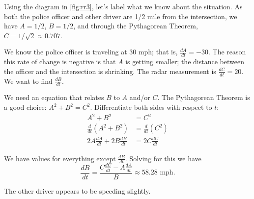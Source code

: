 {Using the diagram in \autoref{fig:rr3}, let's label what we know about the situation. As both the police officer and other driver are 1/2 mile from the intersection, we have $A = 1/2$, $B = 1/2$, and through the Pythagorean Theorem, $C = 1/\sqrt{2}\approx 0.707$. 

We know the police officer is traveling at 30 mph; that is, $\frac{dA}{dt} = -30$. The reason this rate of change is negative is that $A$ is getting smaller; the distance between the officer and the intersection is shrinking. The radar measurement is $\frac{dC}{dt} = 20$. We want to find $\frac{dB}{dt}$. 

We need an equation that relates $B$ to $A$ and/or $C$. The Pythagorean Theorem is a good choice: $A^2+B^2 = C^2$. Differentiate both sides with respect to $t$:
\begin{align*}
	A^2 + B^2 &= C^2 \\
	\frac{d}{dt}\left(A^2+B^2\right) &= \frac{d}{dt}\left(C^2\right) \\
	2A\frac{dA}{dt} + 2B\frac{dB}{dt} &= 2C\frac{dC}{dt}
\end{align*}


We have values for everything except $\frac{dB}{dt}$. Solving for this we have 
\[
\frac{dB}{dt} = \frac{C\frac{dC}{dt}- A\frac{dA}{dt}}{B} \approx 58.28\text{ mph}.
\]
		
The other driver appears to be speeding slightly.	}

